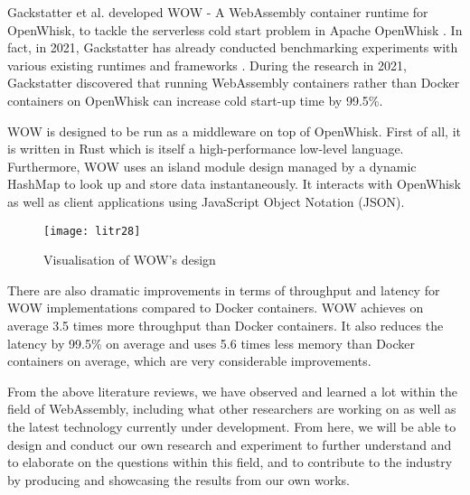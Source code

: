 Gackstatter et al. developed WOW - A WebAssembly container runtime for OpenWhisk, to tackle the serverless cold start problem in Apache OpenWhisk \cite{lit45}. In fact, in 2021, Gackstatter has already conducted benchmarking experiments with various existing runtimes and frameworks \cite{lit32}. During the research in 2021, Gackstatter discovered that running WebAssembly containers rather than Docker containers on OpenWhisk can increase cold start-up time by 99.5\%.

WOW is designed to be run as a middleware on top of OpenWhisk. First of all, it is written in Rust which is itself a high-performance low-level language. Furthermore, WOW uses an island module design managed by a dynamic HashMap to look up and store data instantaneously. It interacts with OpenWhisk as well as client applications using JavaScript Object Notation (JSON).

\newpage
\bigskip
\begin{figure}[hp]
\centering
\texttt{[image: litr28]}
\caption{\footnotesize{Visualisation of WOW’s design \cite{lit43}}}
\captionsetup{aboveskip=0pt,font=it}
\end{figure}
\bigskip

There are also dramatic improvements in terms of throughput and latency for WOW implementations compared to Docker containers. WOW achieves on average 3.5 times more throughput than Docker containers. It also reduces the latency by 99.5\% on average and uses 5.6 times less memory than Docker containers on average, which are very considerable improvements.

From the above literature reviews, we have observed and learned a lot within the field of WebAssembly, including what other researchers are working on as well as the latest technology currently under development. From here, we will be able to design and conduct our own research and experiment to further understand and to elaborate on the questions within this field, and to contribute to the industry by producing and showcasing the results from our own works.